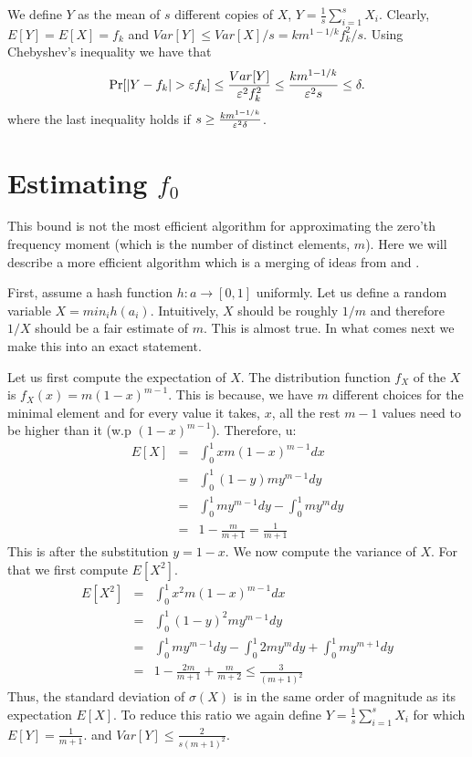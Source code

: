 \documentclass{article}
\begin{document}
We define $Y$ as the mean of $s$ different copies of $X$, $Y = \frac{1}{s}\sum_{i=1}^{s}X_i$.
Clearly, $E[Y] = E[X] = f_k$ and $Var[Y] \le Var[X]/s =  km^{1-1/k}f_{k}^{2}/s$.
Using Chebyshev's inequality we have that 
\[
\Pr[|Y - f_k| > \varepsilon f_k] \le \frac{Var[Y]}{\varepsilon^2 f_{k}^{2}} \le \frac{km^{1-1/k}}{\varepsilon^2 s} \le \delta.
\]
where the last inequality holds if $ s \ge \frac{km^{1-1/k}}{\varepsilon^2 \delta}$.

\section*{Estimating $f_0$}
This bound is not the most efficient algorithm for approximating the 
zero'th frequency moment (which is the number of distinct elements, $m$).
Here we will describe a more efficient algorithm which is a merging of ideas from \cite{} and \cite{}.

First, assume a hash function $h: a \rightarrow [0,1]$ uniformly.
Let us define a random variable $X = min_{i}h(a_i)$.
Intuitively, $X$ should be roughly $1/m$ and therefore $1/X$ should be a fair estimate of $m$.
This is almost true. In what comes next we make this into an exact statement.


Let us first compute the expectation of $X$. The distribution function $f_X$ of the $X$
is $f_X(x) = m(1-x)^{m-1}$. This is because, we have $m$ different choices for the minimal 
element and for every value it takes, $x$, all the rest $m-1$ values
need to be higher than it (w.p $(1-x)^{m-1}$). Therefore, u:
\begin{eqnarray*}
E[X] &=& \int_{0}^{1} x m (1-x)^{m-1}dx \\
&=& \int_{0}^{1} (1- y) m y^{m-1}dy \\
&=& \int_{0}^{1} m y^{m-1}dy - \int_{0}^{1} m y^{m}dy\\
&=& 1- \frac{m}{m+1} = \frac{1}{m+1}
\end{eqnarray*}
This is after the substitution $y = 1-x$. We now compute the variance of $X$.
For that we first compute $E[X^2]$.
\begin{eqnarray*}
E[X^2] &=& \int_{0}^{1} x^2 m (1-x)^{m-1}dx \\
&=& \int_{0}^{1} (1- y)^2 m y^{m-1}dy \\
&=& \int_{0}^{1} m y^{m-1}dy - \int_{0}^{1} 2 m y^{m}dy + \int_{0}^{1}  m y^{m+1}dy\\
&=& 1- \frac{2m}{m+1} + \frac{m}{m+2} \le \frac{3}{(m+1)^2}
\end{eqnarray*}
Thus, the standard deviation of $\sigma(X)$ is in the same order of magnitude as its expectation $E[X]$.
To reduce this ratio we again define $Y = \frac{1}{s}\sum_{i=1}^{s}X_i$ for which $E[Y] = \frac{1}{m+1}$.
and $Var[Y] \le \frac{2}{s(m+1)^2}$.
\end{document}
